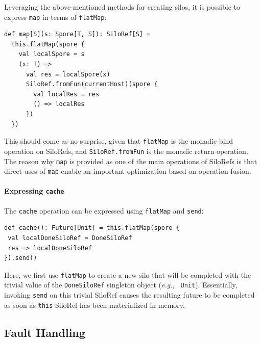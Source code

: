 \documentclass[10pt]{sigplanconf}
\theoremstyle{definition}
\theoremstyle{definition}
\newcommand{\eg}{{\em e.g.,~}}
\begin{document}
Leveraging the above-mentioned methods for creating silos, it is possible to
express \verb|map| in terms of \verb|flatMap|:

\begin{lstlisting}
def map[S](s: Spore[T, S]): SiloRef[S] =
  this.flatMap(spore {
    val localSpore = s
    (x: T) =>
      val res = localSpore(x)
      SiloRef.fromFun(currentHost)(spore {
        val localRes = res
        () => localRes
      })
  })
\end{lstlisting}
\noindent
This should come as no surprise, given that \verb|flatMap| is the monadic bind
operation on SiloRefs, and \verb|SiloRef.fromFun| is the monadic return
operation. The reason why \verb|map| is provided as one of the main operations
of SiloRefs is that direct uses of \verb|map| enable an important optimization
based on operation fusion.

\paragraph{Expressing \texttt{cache}}

The \verb|cache| operation can be expressed using \verb|flatMap| and
\verb|send|:

\begin{lstlisting}
def cache(): Future[Unit] = this.flatMap(spore {
 val localDoneSiloRef = DoneSiloRef
 res => localDoneSiloRef
}).send()

\end{lstlisting}
\noindent
Here, we first use \verb|flatMap| to create a new silo that will be completed
with the trivial value of the \verb|DoneSiloRef| singleton object (\eg
\verb|Unit|). Essentially, invoking \verb|send| on this trivial SiloRef causes
the resulting future to be completed as soon as \verb|this| SiloRef has been
materialized in memory.





\subsection{Fault Handling}
\label{sec:fault-handling}
\end{document}
